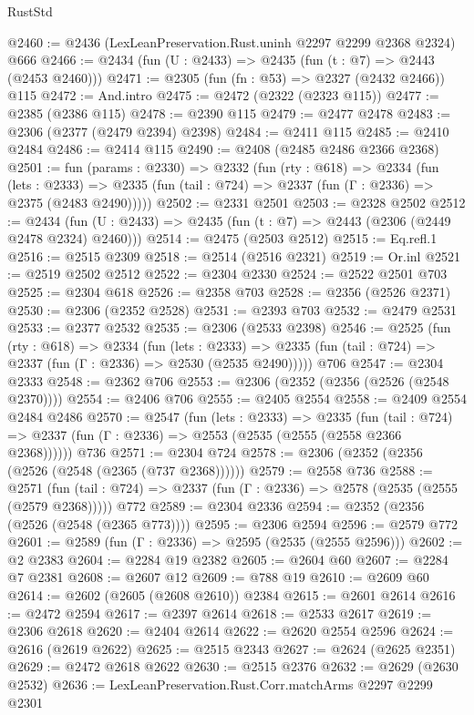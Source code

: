 \begin{lexlean}{RustStd}
\begin{coremodule}
@2460 := @2436 (LexLeanPreservation.Rust.uninh @2297 @2299 @2368 @2324) @666
@2466 := @2434 (fun (U : @2433) => @2435 (fun (t : @7) => @2443 (@2453 @2460)))
@2471 := @2305 (fun (fn : @53) => @2327 (@2432 @2466)) @115
@2472 := And.intro
@2475 := @2472 (@2322 (@2323 @115))
@2477 := @2385 (@2386 @115)
@2478 := @2390 @115
@2479 := @2477 @2478
@2483 := @2306 (@2377 (@2479 @2394) @2398)
@2484 := @2411 @115
@2485 := @2410 @2484
@2486 := @2414 @115
@2490 := @2408 (@2485 @2486 @2366 @2368)
@2501 := fun (params : @2330) =>
  @2332
    (fun (rty : @618) =>
    @2334
      (fun (lets : @2333) =>
      @2335 (fun (tail : @724) => @2337 (fun (Γ : @2336) => @2375 (@2483 @2490)))))
@2502 := @2331 @2501
@2503 := @2328 @2502
@2512 := @2434 (fun (U : @2433) => @2435 (fun (t : @7) => @2443 (@2306 (@2449 @2478 @2324) @2460)))
@2514 := @2475 (@2503 @2512)
@2515 := Eq.refl.{1}
@2516 := @2515 @2309
@2518 := @2514 (@2516 @2321)
@2519 := Or.inl
@2521 := @2519 @2502 @2512
@2522 := @2304 @2330
@2524 := @2522 @2501 @703
@2525 := @2304 @618
@2526 := @2358 @703
@2528 := @2356 (@2526 @2371)
@2530 := @2306 (@2352 @2528)
@2531 := @2393 @703
@2532 := @2479 @2531
@2533 := @2377 @2532
@2535 := @2306 (@2533 @2398)
@2546 := @2525
    (fun (rty : @618) =>
    @2334
      (fun (lets : @2333) =>
      @2335 (fun (tail : @724) => @2337 (fun (Γ : @2336) => @2530 (@2535 @2490)))))
    @706
@2547 := @2304 @2333
@2548 := @2362 @706
@2553 := @2306 (@2352 (@2356 (@2526 (@2548 @2370))))
@2554 := @2406 @706
@2555 := @2405 @2554
@2558 := @2409 @2554 @2484 @2486
@2570 := @2547
    (fun (lets : @2333) =>
    @2335
      (fun (tail : @724) => @2337 (fun (Γ : @2336) => @2553 (@2535 (@2555 (@2558 @2366 @2368))))))
    @736
@2571 := @2304 @724
@2578 := @2306 (@2352 (@2356 (@2526 (@2548 (@2365 (@737 @2368))))))
@2579 := @2558 @736
@2588 := @2571
    (fun (tail : @724) => @2337 (fun (Γ : @2336) => @2578 (@2535 (@2555 (@2579 @2368)))))
    @772
@2589 := @2304 @2336
@2594 := @2352 (@2356 (@2526 (@2548 (@2365 @773))))
@2595 := @2306 @2594
@2596 := @2579 @772
@2601 := @2589 (fun (Γ : @2336) => @2595 (@2535 (@2555 @2596)))
@2602 := @2 @2383
@2604 := @2284 @19 @2382
@2605 := @2604 @60
@2607 := @2284 @7 @2381
@2608 := @2607 @12
@2609 := @788 @19
@2610 := @2609 @60
@2614 := @2602 (@2605 (@2608 @2610)) @2384
@2615 := @2601 @2614
@2616 := @2472 @2594
@2617 := @2397 @2614
@2618 := @2533 @2617
@2619 := @2306 @2618
@2620 := @2404 @2614
@2622 := @2620 @2554 @2596
@2624 := @2616 (@2619 @2622)
@2625 := @2515 @2343
@2627 := @2624 (@2625 @2351)
@2629 := @2472 @2618 @2622
@2630 := @2515 @2376
@2632 := @2629 (@2630 @2532)
@2636 := LexLeanPreservation.Rust.Corr.matchArms @2297 @2299 @2301

\end{coremodule}
\end{lexlean}
